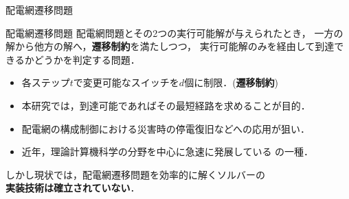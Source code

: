 \documentclass[dvipdfmx,11pt]{beamer}
\begin{document}
\begin{frame}{配電網遷移問題}
 \begin{alertblock}{配電網遷移問題}
  配電網問題とその2つの実行可能解が与えられたとき，
  一方の解から他方の解へ，\alert{\bf 遷移制約}を満たしつつ，
  実行可能解のみを経由して到達できるかどうかを判定する問題．
  \begin{itemize}
  \item 各ステップ$t$で変更可能なスイッチを$d$個に制限．(\textbf{遷移制約})
  \item 本研究では，到達可能であればその最短経路を求めることが目的．
  \end{itemize}
 \end{alertblock}
 \begin{itemize}
  \item 配電網の構成制御における災害時の停電復旧などへの応用が狙い．
  \item 近年，理論計算機科学の分野を中心に急速に発展している
        の一種．
 \end{itemize}
 \begin{alertblock}{}\centering
  しかし現状では，配電網遷移問題を効率的に解くソルバーの \\
  \alert{\bf 実装技術は確立されていない}．
 \end{alertblock}
\end{frame}
\end{document}
